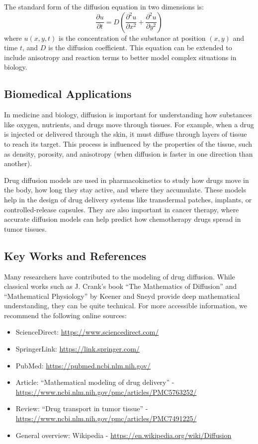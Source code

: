 \documentclass[11pt, a4paper]{article}
\begin{document}
The standard form of the diffusion equation in two dimensions is:
\[
\frac{\partial u}{\partial t} = D \left( \frac{\partial^2 u}{\partial x^2} + \frac{\partial^2 u}{\partial y^2} \right)
\]
where \( u(x, y, t) \) is the concentration of the substance at position \((x, y)\) and time \(t\), and \(D\) is the diffusion coefficient. This equation can be extended to include anisotropy and reaction terms to better model complex situations in biology.

\subsection{Biomedical Applications}
In medicine and biology, diffusion is important for understanding how substances like oxygen, nutrients, and drugs move through tissues.
For example, when a drug is injected or delivered through the skin, it must diffuse through layers of tissue to reach its target.
This process is influenced by the properties of the tissue, such as density, porosity, and anisotropy (when diffusion is faster in one direction than another).

Drug diffusion models are used in pharmacokinetics to study how drugs move in the body, how long they stay active, and where they accumulate.
These models help in the design of drug delivery systems like transdermal patches, implants, or controlled-release capsules.
They are also important in cancer therapy, where accurate diffusion models can help predict how chemotherapy drugs spread in tumor tissues.

\subsection{Key Works and References}
Many researchers have contributed to the modeling of drug diffusion. While classical works such as J. Crank’s book “The Mathematics of Diffusion” and “Mathematical Physiology” by Keener and Sneyd provide deep mathematical understanding, they can be quite technical. For more accessible information, we recommend the following online sources:

\begin{itemize}
  \item ScienceDirect: \url{https://www.sciencedirect.com/}
  \item SpringerLink: \url{https://link.springer.com/}
  \item PubMed: \url{https://pubmed.ncbi.nlm.nih.gov/}
  \item Article: “Mathematical modeling of drug delivery” - \url{https://www.ncbi.nlm.nih.gov/pmc/articles/PMC5763252/}
  \item Review: “Drug transport in tumor tissue” - \url{https://www.ncbi.nlm.nih.gov/pmc/articles/PMC7491225/}
  \item General overview: Wikipedia - \url{https://en.wikipedia.org/wiki/Diffusion}
\end{itemize}
\end{document}
